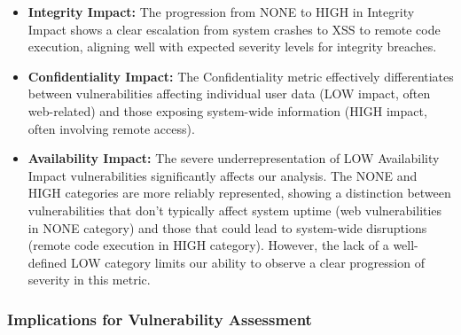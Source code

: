 \documentclass[12pt]{article}
\begin{document}
\begin{itemize}

	\item \textbf{Integrity Impact:} The progression from NONE to HIGH in Integrity Impact shows a
	      clear escalation from system crashes to XSS to remote code execution, aligning well with
	      expected severity levels for integrity breaches.

	\item \textbf{Confidentiality Impact:} The Confidentiality metric effectively differentiates
	      between vulnerabilities affecting individual user data (LOW impact, often web-related) and
	      those exposing system-wide information (HIGH impact, often involving remote access).

	\item \textbf{Availability Impact:} The severe underrepresentation of LOW Availability Impact
	      vulnerabilities significantly affects our analysis. The NONE and HIGH categories are more
	      reliably represented, showing a distinction between vulnerabilities that don't typically
	      affect system uptime (web vulnerabilities in NONE category) and those that could lead to
	      system-wide disruptions (remote code execution in HIGH category). However, the lack of a
	      well-defined LOW category limits our ability to observe a clear progression of severity in
	      this metric.

\end{itemize}

\subsubsection{Implications for Vulnerability Assessment}
\end{document}
